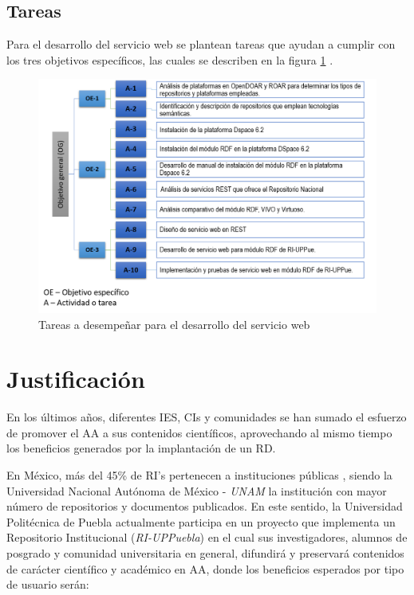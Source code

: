 \subsection{Tareas}

Para el desarrollo del servicio web se plantean tareas que ayudan a cumplir con los tres objetivos específicos, las cuales se describen en la figura \ref{actividades_objetivos} .\newline

\begin{figure}[!ht]
    \centering
    \includegraphics[width=12cm]{figures/Actividades_Dic_2018.png} %
    \caption{Tareas a desempeñar para el desarrollo del servicio web} %
    \label{actividades_objetivos}
\end{figure}

\section{Justificación}

En los últimos años, diferentes IES, CIs y comunidades se han sumado el esfuerzo de promover el AA a sus contenidos científicos, aprovechando al mismo tiempo los beneficios generados por la implantación de un RD.\newline

En México, más del 45\% de RI's pertenecen a instituciones públicas \cite{RI_REMERI}, siendo la Universidad Nacional Autónoma de México - \textit{UNAM} la institución con mayor número de repositorios y documentos publicados. En este sentido, la Universidad Politécnica de Puebla actualmente participa en un proyecto que implementa un Repositorio Institucional (\textit{RI-UPPuebla}) en el cual sus investigadores, alumnos de posgrado y comunidad universitaria en general, difundirá y preservará contenidos de carácter científico y académico en AA, donde los beneficios esperados por tipo de usuario serán:

